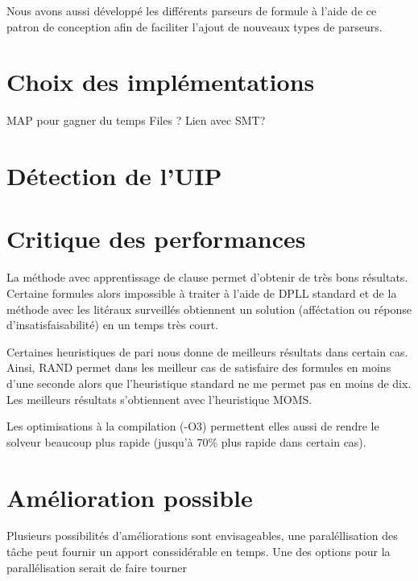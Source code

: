 \documentclass{article}
\begin{document}
Nous avons aussi développé les différents parseurs de formule à l'aide de ce patron de conception afin de faciliter l'ajout de nouveaux types de parseurs.
\section{Choix des implémentations}
MAP pour gagner du temps
Files ?
Lien avec SMT?

\section{Détection de l'UIP}

\section{Critique des performances}
La méthode avec apprentissage de clause permet d'obtenir de très bons résultats. Certaine formules alors impossible à traiter à l'aide de DPLL standard et de la méthode avec les litéraux surveillés obtiennent un solution (afféctation ou réponse d'insatisfaisabilité) en un temps très court.

Certaines heuristiques de pari nous donne de meilleurs résultats dans certain cas. Ainsi, RAND permet dans les meilleur cas de satisfaire des formules en moins d'une seconde alors que l'heuristique standard ne me permet pas en moins de dix. Les meilleurs résultats s'obtiennent avec l'heuristique MOMS.

Les optimisations à la compilation (-O3) permettent elles aussi de rendre le solveur beaucoup plus rapide (jusqu'à 70\% plus rapide dans certain cas).

\section{Amélioration possible}
Plusieurs possibilités d'améliorations sont envisageables, une paraléllisation des tâche peut fournir un apport conssidérable en temps. Une des options pour la parallélisation serait de faire tourner 



\end{document}
